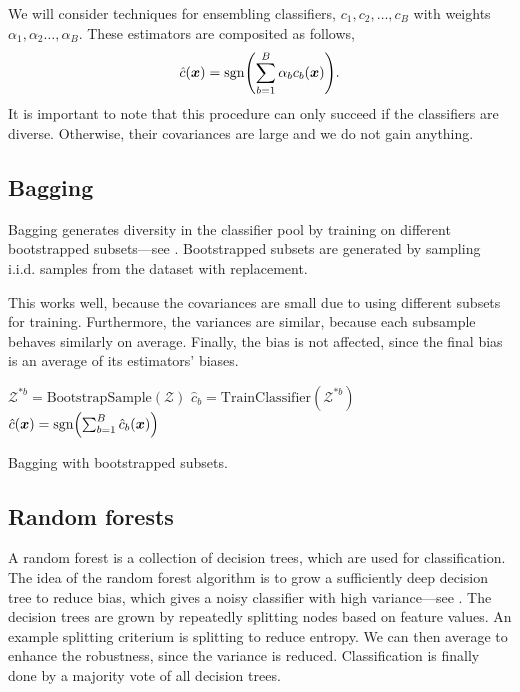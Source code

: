 We will consider techniques for ensembling classifiers, $c_1, c_2, \ldots, c_B$ with weights
$\alpha_1, \alpha_2 \ldots, \alpha_B$. These estimators are composited as follows, \[
    \hat{c}(\vec{x}) = \mathrm{sgn} \lft( \sum_{b=1}^{B} \alpha_b c_b(\vec{x}) \rgt).
\]
It is important to note that this procedure can only succeed if the classifiers are diverse.
Otherwise, their covariances are large and we do not gain anything.

\subsection{Bagging}

Bagging generates diversity in the classifier pool by training on different bootstrapped
subsets---see . Bootstrapped subsets are generated by sampling i.i.d. samples
from the dataset with replacement.

This works well, because the covariances are small due to using different subsets for training.
Furthermore, the variances are similar, because each subsample behaves similarly on average.
Finally, the bias is not affected, since the final bias is an average of its estimators' biases.

\begin{algorithm}[t]
    \begin{algorithmic}[1]
        \State $\mathcal{Z}^{*b} = \mathrm{BootstrapSample}(\mathcal{Z})$
        \State $\hat{c}_b = \mathrm{TrainClassifier}(\mathcal{Z}^{*b})$
        \EndFor
        \State \Return $\hat{c}(\vec{x}) = \mathrm{sgn}\lft( \sum_{b=1}^{B} \hat{c}_b(\vec{x}) \rgt)$
    \end{algorithmic}
    \label{alg:bootstrap}
    \caption{Bagging with bootstrapped subsets.}
\end{algorithm}

\subsection{Random forests}

A random forest is a collection of decision trees, which are used for classification. The idea of
the random forest algorithm is to grow a sufficiently deep decision tree to reduce bias, which
gives a noisy classifier with high variance---see . The decision trees are
grown by repeatedly splitting nodes based on feature values. An example splitting criterium is
splitting to reduce entropy. We can then average to enhance the robustness, since the variance is
reduced. Classification is finally done by a majority vote of all decision trees.

